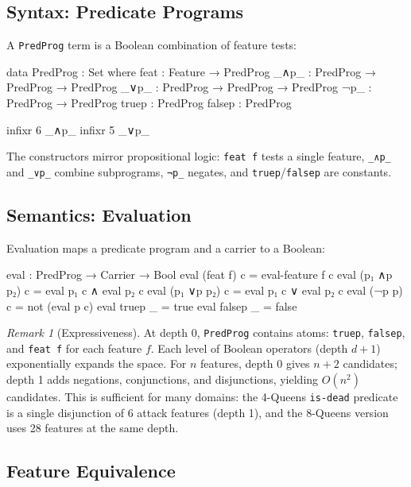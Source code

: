 \documentclass[9pt,a4paper]{article}
\theoremstyle{plain}
\theoremstyle{definition}
\theoremstyle{remark}
\newtheorem{remark}{Remark}
\begin{document}
\subsection{Syntax: Predicate Programs}

A \texttt{PredProg} term is a Boolean combination of feature tests:

\begin{code}
  data PredProg : Set where
    feat   : Feature → PredProg
    _∧p_   : PredProg → PredProg → PredProg
    _∨p_   : PredProg → PredProg → PredProg
    ¬p_    : PredProg → PredProg
    truep  : PredProg
    falsep : PredProg

  infixr 6 _∧p_
  infixr 5 _∨p_
\end{code}

\noindent The constructors mirror propositional logic: \texttt{feat f} tests a single feature, \texttt{\_∧p\_} and \texttt{\_∨p\_} combine subprograms, \texttt{¬p\_} negates, and \texttt{truep}/\texttt{falsep} are constants.

\subsection{Semantics: Evaluation}

Evaluation maps a predicate program and a carrier to a Boolean:

\begin{code}
  eval : PredProg → Carrier → Bool
  eval (feat f)    c = eval-feature f c
  eval (p₁ ∧p p₂) c = eval p₁ c ∧ eval p₂ c
  eval (p₁ ∨p p₂) c = eval p₁ c ∨ eval p₂ c
  eval (¬p p)      c = not (eval p c)
  eval truep       _ = true
  eval falsep      _ = false
\end{code}

\begin{remark}[Expressiveness]
At depth 0, \texttt{PredProg} contains atoms: \texttt{truep}, \texttt{falsep}, and \texttt{feat f} for each feature $f$.  Each level of Boolean operators (depth $d+1$) exponentially expands the space.  For $n$ features, depth 0 gives $n+2$ candidates; depth 1 adds negations, conjunctions, and disjunctions, yielding $O(n^2)$ candidates.  This is sufficient for many domains: the 4-Queens \texttt{is-dead} predicate is a single disjunction of 6 attack features (depth 1), and the 8-Queens version uses 28 features at the same depth.
\end{remark}

\subsection{Feature Equivalence}
\end{document}
